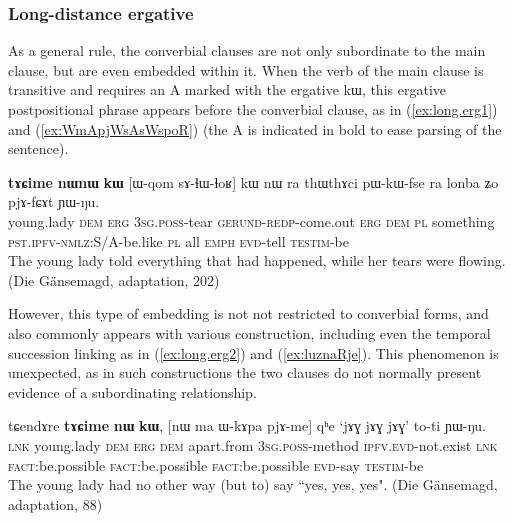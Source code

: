 \documentclass[oldfontcommands,oneside,a4paper,11pt]{article}
\newcommand{\ipa}[1]{{\phon \mbox{#1}}} %
\newcommand{\refb}[1]{(\ref{#1})}
\begin{document}
\subsubsection{Long-distance ergative}
As a general rule, the converbial clauses are not only subordinate to the main clause, but are even embedded within it. When the verb of the main clause is transitive and requires an A marked with the ergative \ipa{kɯ}, this ergative postpositional  phrase appears before the converbial clause, as in \refb{ex:long.erg1} and \refb{ex:WmApjWsAsWspoR} (the A is indicated in bold to ease parsing of the sentence).

\begin{exe}
\ex \label{ex:long.erg1}
\gll 
\ipa{\textbf{tɤɕime}} 	\ipa{\textbf{nɯnɯ}} 	\ipa{\textbf{kɯ}} 	[\ipa{ɯ-qom} 	\ipa{sɤ-ɬɯ-ɬoʁ}] 	\ipa{kɯ} 	\ipa{nɯ} \ipa{ra} 	\ipa{thɯthɤci} 	\ipa{pɯ-kɯ-fse} 	\ipa{ra} 	\ipa{lonba} 	\ipa{ʑo} 	\ipa{pjɤ-fɕɤt} 	\ipa{ɲɯ-ŋu.} 	\\
young.lady \textsc{dem} \textsc{erg} \textsc{3sg.poss}-tear \textsc{gerund-redp}-come.out \textsc{erg} \textsc{dem} \textsc{pl} something \textsc{pst.ipfv-nmlz}:S/A-be.like \textsc{pl} all \textsc{emph} \textsc{evd}-tell \textsc{testim}-be \\
\glt The young lady told everything that had happened, while her tears were flowing. (Die Gänsemagd, adaptation, 202)
\end{exe}

However, this type of embedding is not not restricted to converbial forms, and also commonly appears with various construction, including even the temporal succession linking as in \refb{ex:long.erg2} and \refb{ex:luznaRje}. This phenomenon is unexpected, as in such constructions the two clauses do not normally present evidence of a subordinating relationship.

\begin{exe}
\ex \label{ex:long.erg2}
\gll 
\ipa{tɕendɤre} 	\ipa{\textbf{tɤɕime}} 	\ipa{\textbf{nɯ}} 	\ipa{\textbf{kɯ},} 	[\ipa{nɯ} 	\ipa{ma} 	\ipa{ɯ-kɤpa} 	\ipa{pjɤ-me}] 	\ipa{qʰe} 	`\ipa{jɤɣ} 	\ipa{jɤɣ} 	\ipa{jɤɣ}' 	\ipa{to-ti} 	\ipa{ɲɯ-ŋu.} \\
\textsc{lnk} young.lady \textsc{dem} \textsc{erg} \textsc{dem}  apart.from \textsc{3sg.poss}-method \textsc{ipfv.evd}-not.exist \textsc{lnk} \textsc{fact}:be.possible \textsc{fact}:be.possible \textsc{fact}:be.possible \textsc{evd}-say \textsc{testim}-be \\
\glt The young lady had no other way (but to) say ``yes, yes, yes". (Die Gänsemagd, adaptation, 88)
\end{exe}
\end{document}
